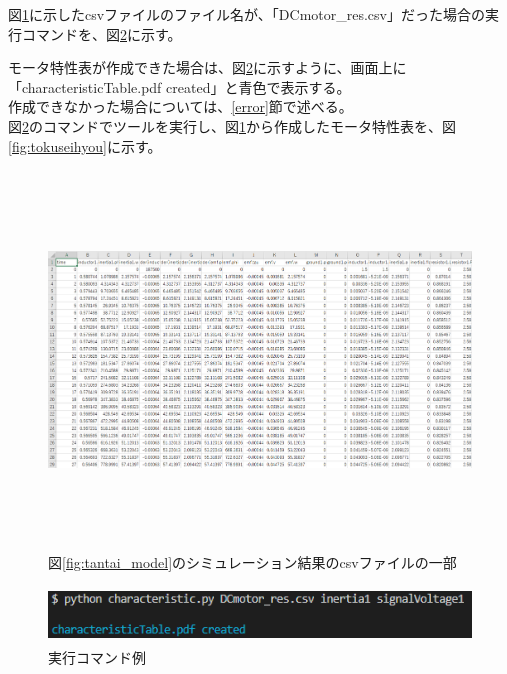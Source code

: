 図\ref{fig:simyu_csv}に示したcsvファイルのファイル名が、「DCmotor\_res.csv」だった場合の実行コマンドを、図\ref{fig:zikkou}に示す。

モータ特性表が作成できた場合は、図\ref{fig:zikkou}に示すように、画面上に「characteristicTable.pdf created」と青色で表示する。\\
作成できなかった場合については、\ref{error}節で述べる。\\
図\ref{fig:zikkou}のコマンドでツールを実行し、図\ref{fig:simyu_csv}から作成したモータ特性表を、図\ref{fig:tokuseihyou}に示す。


\begin{figure}[t]
	\centering
	\includegraphics[width=16.5cm,height=10cm]{./Image/simyu_csv.png}
	\caption{図\ref{fig:tantai_model}のシミュレーション結果のcsvファイルの一部}
	\label{fig:simyu_csv}
\end{figure}

\begin{figure}[t]
	\centering
	\includegraphics[width=12cm,height=1.5cm]{./Image/succes_comand.png}
	\caption{実行コマンド例}
	\label{fig:zikkou}
\end{figure}



